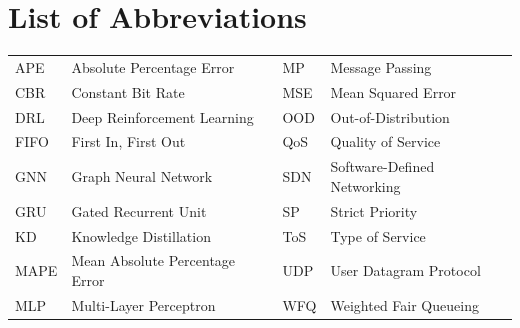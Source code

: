 \chapter*{List of Abbreviations}

{\small
\begin{tabular}{@{}p{14mm}p{56mm}p{13mm}p{56mm}@{}}
APE  & Absolute Percentage Error      & MP   & Message Passing \\
CBR  & Constant Bit Rate              & MSE  & Mean Squared Error \\
DRL  & Deep Reinforcement Learning    & OOD  & Out-of-Distribution \\
FIFO & First In, First Out            & QoS  & Quality of Service \\
GNN  & Graph Neural Network           & SDN  & Software-Defined Networking \\
GRU  & Gated Recurrent Unit           & SP   & Strict Priority \\
KD   & Knowledge Distillation         & ToS  & Type of Service \\
MAPE & Mean Absolute Percentage Error & UDP  & User Datagram Protocol \\
MLP  & Multi-Layer Perceptron         & WFQ  & Weighted Fair Queueing \\
\end{tabular}
}
